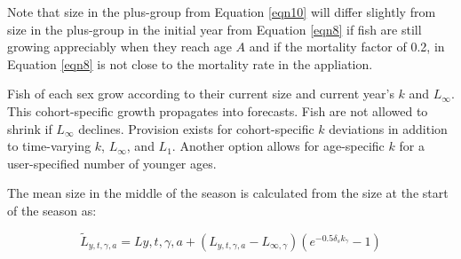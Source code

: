 \documentclass[11pt,
  english,
  letterpaper,
]{article}
\begin{document}
\leavevmode\tagmcend\tagstructend\par


Note that size in the plus-group from Equation \ref{eqn10} will differ slightly from size in the plus-group in the initial year from Equation \ref{eqn8} if fish are still growing appreciably when they reach age {\(A\)\leavevmode\tagmcend\tagstructend} and if the mortality factor of 0.2, in Equation \ref{eqn8} is not close to the mortality rate in the appliation.

\leavevmode\tagmcend\tagstructend\par


Fish of each sex grow according to their current size and current year's {\(k\)\leavevmode\tagmcend\tagstructend} and {\(L_{\infty}\)\leavevmode\tagmcend\tagstructend}. This cohort-specific growth propagates into forecasts. Fish are not allowed to shrink if {\(L_{\infty}\)\leavevmode\tagmcend\tagstructend} declines. Provision exists for cohort-specific {\(k\)\leavevmode\tagmcend\tagstructend} deviations in addition to time-varying {\(k\)\leavevmode\tagmcend\tagstructend}, {\(L_{\infty}\)\leavevmode\tagmcend\tagstructend}, and {\(L_1\)\leavevmode\tagmcend\tagstructend}. Another option allows for age-specific {\(k\)\leavevmode\tagmcend\tagstructend} for a user-specified number of younger ages.

\leavevmode\tagmcend\tagstructend\par


The mean size in the middle of the season is calculated from the size at the start of the season as:

\leavevmode\tagmcend\tagstructend\par


\begin{equation}
\label{eqn11}
\tilde{L}_{y,t,\gamma,a} = L{y,t,\gamma,a} + (L_{y,t,\gamma,a} - L_{\infty,\gamma})(e^{-0.5\delta_{s}k_{\gamma}} - 1)
\end{equation}
\end{document}
